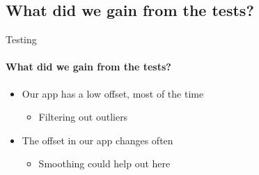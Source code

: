     \subsection{What did we gain from the tests?}
        \begin{frame}{Testing}\framesubtitle{What did we gain from the tests?}
            \begin{itemize}
                \item Our app has a low offset, most of the time
                \begin{itemize}
                    \item Filtering out outliers
                \end{itemize}
                \item The offset in our app changes often
                \begin{itemize}
                    \item Smoothing could help out here
                \end{itemize}

            \end{itemize}
        \end{frame}
